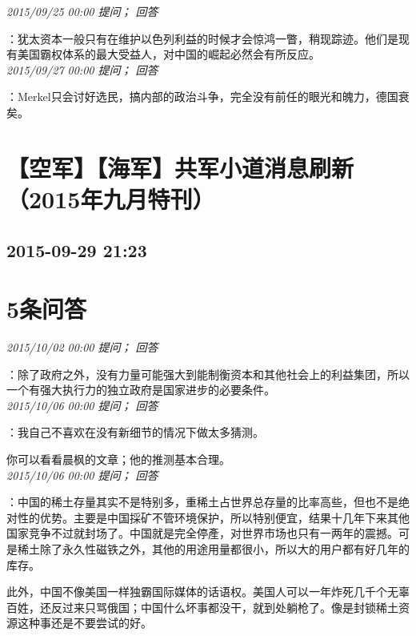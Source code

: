 \documentclass[twocolumn]{ctexart}
\begin{document}
\textit{\hfill\noindent\small 2015/09/25 00:00 提问； 回答}

：犹太资本一般只有在维护以色列利益的时候才会惊鸿一瞥，稍现踪迹。他们是现有美国霸权体系的最大受益人，对中国的崛起必然会有所反应。\\

\textit{\hfill\noindent\small 2015/09/27 00:00 提问； 回答}

：Merkel只会讨好选民，搞内部的政治斗争，完全没有前任的眼光和魄力，德国衰矣。\\


\section{【空军】【海军】共军小道消息刷新（2015年九月特刊）}
\subsection{2015-09-29 21:23}


\section{5条问答}

\textit{\hfill\noindent\small 2015/10/02 00:00 提问； 回答}

：除了政府之外，没有力量可能强大到能制衡资本和其他社会上的利益集团，所以一个有强大执行力的独立政府是国家进步的必要条件。\\

\textit{\hfill\noindent\small 2015/10/06 00:00 提问； 回答}

：我自己不喜欢在没有新细节的情况下做太多猜测。

你可以看看晨枫的文章；他的推测基本合理。\\

\textit{\hfill\noindent\small 2015/10/06 00:00 提问； 回答}

：中国的稀土存量其实不是特别多，重稀土占世界总存量的比率高些，但也不是绝对性的优势。主要是中国採矿不管环境保护，所以特别便宜，结果十几年下来其他国家竞争不过就封场了。中国就是完全停產，对世界市场也只有一两年的震撼。可是稀土除了永久性磁铁之外，其他的用途用量都很小，所以大的用户都有好几年的库存。

此外，中国不像美国一样独霸国际媒体的话语权。美国人可以一年炸死几千个无辜百姓，还反过来只骂俄国；中国什么坏事都没干，就到处躺枪了。像是封锁稀土资源这种事还是不要尝试的好。\\
\end{document}
